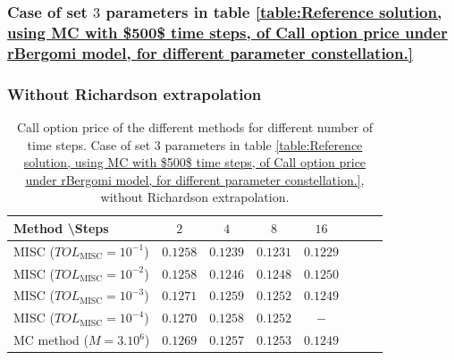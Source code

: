 \FloatBarrier

\subsubsection{Case of set $3$ parameters in table \ref{table:Reference solution, using MC with $500$ time steps, of Call option price under rBergomi model, for different parameter constellation.}}\label{sec:Case of set 3 parameters}


\subsubsection*{Without Richardson extrapolation}

\begin{table}[h!]
	\centering
	\begin{tabular}{l*{6}{c}r}
		Method \textbackslash  Steps            & $2$ & $4$ & $8$ & $16$ &   \\
		\hline
		MISC ($TOL_{\text{MISC}}=10^{-1}$)  & $0.1258$ & $0.1239$ & $0.1231$ & $0.1229$  \\
		MISC ($TOL_{\text{MISC}}=10^{-2}$)  & $0.1258$ & $0.1246$ & $0.1248$ & $0.1250$  \\
		
		MISC ($TOL_{\text{MISC}}=10^{-3}$)  & $0.1271$ & $0.1259$ & $0.1252$ & $0.1249$  \\
		MISC ($TOL_{\text{MISC}}=10^{-4}$)  & $0.1270$ & $0.1258$ & $0.1252$ & $-$  \\
		
		\hline
		MC method ($M=3.10^{6}$)   & $    0.1269$ & $0.1257$  & $0.1253$ & $0.1249$ \\		
		
		\hline
	\end{tabular}
	\caption{ Call option price of the different methods for different number of time steps. Case of set $3$ parameters in table \ref{table:Reference solution, using MC with $500$ time steps, of Call option price under rBergomi model, for different parameter constellation.}, without Richardson extrapolation.}
	\label{table: Call option price of the different methods for different number of time steps. Case set 3}
\end{table}



